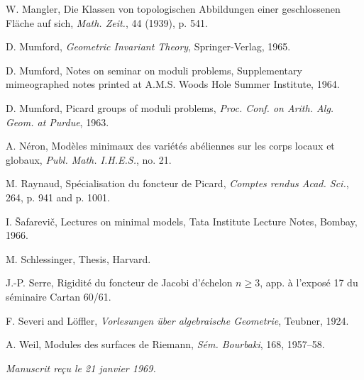 \documentclass[10pt]{article}
\begin{document}
\begin{description}[leftmargin=2.4em,labelwidth=2.1em,itemsep=0.05em]
\item[{[Ma]}] W. Mangler, Die Klassen von topologischen Abbildungen einer geschlossenen Fläche auf sich, \emph{Math. Zeit.}, 44 (1939), p. 541.
\item[{[M$_1$]}] D. Mumford, \emph{Geometric Invariant Theory}, Springer-Verlag, 1965.
\item[{[M$_2$]}] D. Mumford, Notes on seminar on moduli problems, Supplementary mimeographed notes printed at A.M.S. Woods Hole Summer Institute, 1964.
\item[{[M$_3$]}] D. Mumford, Picard groups of moduli problems, \emph{Proc. Conf. on Arith. Alg. Geom. at Purdue}, 1963.
\item[{[N]}] A. Néron, Modèles minimaux des variétés abéliennes sur les corps locaux et globaux, \emph{Publ. Math. I.H.E.S.}, no. 21.
\item[{[R]}] M. Raynaud, Spécialisation du foncteur de Picard, \emph{Comptes rendus Acad. Sci.}, 264, p. 941 and p. 1001.
\item[{[Š]}] I. Šafarevič, Lectures on minimal models, Tata Institute Lecture Notes, Bombay, 1966.
\item[{[Sc]}] M. Schlessinger, Thesis, Harvard.
\item[{[S]}] J.-P. Serre, Rigidité du foncteur de Jacobi d'échelon $n\geq3$, app. à l'exposé 17 du séminaire Cartan 60/61.
\item[{[Se]}] F. Severi and Löffler, \emph{Vorlesungen über algebraische Geometrie}, Teubner, 1924.
\item[{[W]}] A. Weil, Modules des surfaces de Riemann, \emph{Sém. Bourbaki}, 168, 1957--58.
\end{description}

\begin{flushright}
\emph{Manuscrit reçu le 21 janvier 1969.}
\end{flushright}
\end{document}
